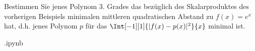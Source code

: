 
\begin{exercise}

Bestimmen Sie jenes Polynom $3$. Grades das bezüglich des Skalarproduktes des vorherigen Beispiels minimalen mittleren quadratischen Abstand zu $f(x) = e^x$ hat, d.h. jenes Polynom $p$ für das $\Int[-1][1]{|f(x) - p(x)|^2}{x}$ minimal ist.

\end{exercise}


\begin{solution}

.ipynb

\end{solution}

